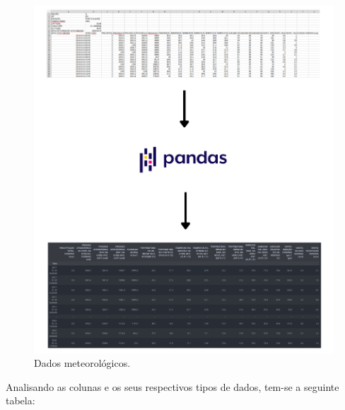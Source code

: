 \begin{figure}[H]
	\caption{\label{fig:base_inmet}Dados meteorológicos.}
	\begin{center}
		\includegraphics[scale=0.5]{figuras/base_inmet.png}
	\end{center}
\end{figure}

Analisando as colunas e os seus respectivos tipos de dados, tem-se a seguinte tabela:

